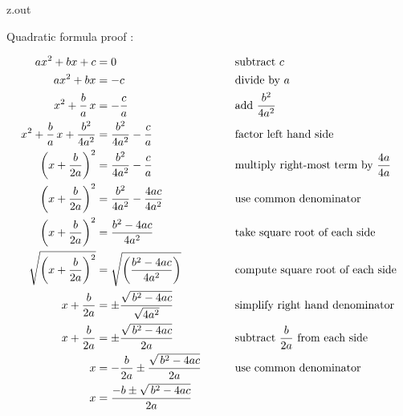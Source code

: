 \begin{VerbatimOut}{z.out}

Quadratic formula proof \cite{khan}:

{
  \addtolength{\jot}{6pt}
  \begin{alignat}{2}
    ax^2 + bx + c
      &= 0
      &
      &\text{subtract $c$}\\
    ax^2 + bx
      &= -c
      &
      &\text{divide by $a$}\notag\\
    x^2 + \frac ba\,x
      &= -\frac ca
      &
      &\text{add $\displaystyle\frac{b^2}{4a^2}$}\notag\\
    x^2+\frac ba\,x+\frac{b^2}{4a^2}
      &= \frac{b^2}{4a^2}-\frac ca
      &
      &\text{factor left hand side}\notag\\
    \left(x+\frac b{2a}\right)^2
      &= \frac{b^2}{4a^2}-\frac ca
      &
      &\text{multiply right-most term by $\displaystyle\frac{4a}{4a}$}\notag\\
    \left(x + \frac b{2a}\right)^2
      &= \frac{b^2}{4a^2}-\frac{4ac}{4a^2}
      &
      &\text{use common denominator}\notag\\
    \left(x + \frac b{2a}\right)^2
      &= \frac{b^2-4ac}{4a^2}
      &
      &\text{take square root of each side}\notag\\
    \sqrt{\left(x + \frac b{2a}\right)^2}
      &= \sqrt{\left(\frac{b^2-4ac}{4a^2}\right)}
      &
      &\text{compute square root of each side}\notag\\
    x + \frac b{2a}
      &= \pm \frac{\sqrt{\,b^2-4ac}}{\sqrt{4a^2}}
      &
      &\text{simplify right hand denominator}\notag\\
    x + \frac b{2a}
      &= \pm \frac{\sqrt{\,b^2-4ac}}{2a}
      &
      &\text{subtract $\displaystyle\frac b{2a}$ from each side}\notag\\
    x
      &= -\frac b{2a} \pm \frac{\sqrt{\,b^2-4ac}}{2a}
      &\qquad
      &\text{use common denominator}\notag\\
    x
      &= \frac{-b \pm \sqrt{\,b^2-4ac}}{2a}
  \end{alignat}
}
\end{VerbatimOut}

\MyIO


